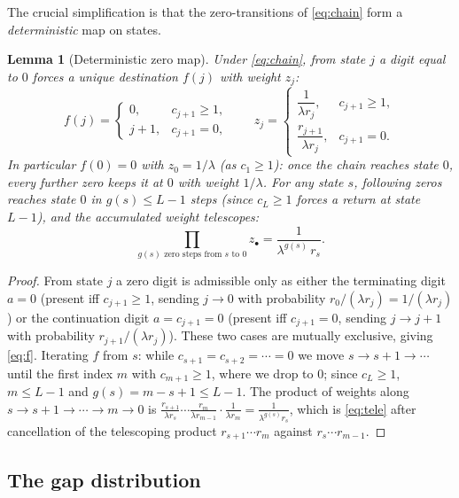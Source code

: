 \documentclass[12pt]{article}
\newtheorem{lemma}{Lemma}
\theoremstyle{definition}
\begin{document}
The crucial simplification is that the zero-transitions of \eqref{eq:chain} form
a \emph{deterministic} map on states.

\begin{lemma}[Deterministic zero map]\label{lem:zero}
Under \eqref{eq:chain}, from state $j$ a digit equal to $0$ forces a unique
destination $f(j)$ with weight $z_j$:
\begin{equation}\label{eq:f}
f(j)=\begin{cases}0,& c_{j+1}\ge1,\\ j+1,& c_{j+1}=0,\end{cases}
\qquad
z_j=\begin{cases}\dfrac{1}{\lambda r_j},& c_{j+1}\ge1,\\[2mm]
\dfrac{r_{j+1}}{\lambda r_j},& c_{j+1}=0.\end{cases}
\end{equation}
In particular $f(0)=0$ with $z_0=1/\lambda$ (as $c_1\ge1$): once the chain
reaches state $0$, every further zero keeps it at $0$ with weight $1/\lambda$.
For any state $s$, following zeros reaches state $0$ in $g(s)\le L-1$ steps (since
$c_L\ge1$ forces a return at state $L-1$), and the accumulated weight telescopes:
\begin{equation}\label{eq:tele}
\prod_{\text{$g(s)$ zero steps from $s$ to $0$}}z_{\bullet}
=\frac{1}{\lambda^{g(s)}\,r_s}.
\end{equation}
\end{lemma}

\begin{proof}
From state $j$ a zero digit is admissible only as either the terminating digit
$a=0$ (present iff $c_{j+1}\ge1$, sending $j\to0$ with probability
$r_0/(\lambda r_j)=1/(\lambda r_j)$) or the continuation digit $a=c_{j+1}=0$
(present iff $c_{j+1}=0$, sending $j\to j+1$ with probability
$r_{j+1}/(\lambda r_j)$). These two cases are mutually exclusive, giving
\eqref{eq:f}. Iterating $f$ from $s$: while $c_{s+1}=c_{s+2}=\cdots=0$ we move
$s\to s+1\to\cdots$ until the first index $m$ with $c_{m+1}\ge1$, where we drop to
$0$; since $c_L\ge1$, $m\le L-1$ and $g(s)=m-s+1\le L-1$. The product of weights
along $s\to s+1\to\cdots\to m\to0$ is
$\frac{r_{s+1}}{\lambda r_s}\cdots\frac{r_m}{\lambda r_{m-1}}\cdot
\frac{1}{\lambda r_m}=\frac{1}{\lambda^{g(s)}r_s}$,
which is \eqref{eq:tele} after cancellation of the telescoping product
$r_{s+1}\cdots r_m$ against $r_s\cdots r_{m-1}$.
\end{proof}

\subsection{The gap distribution}
\end{document}
